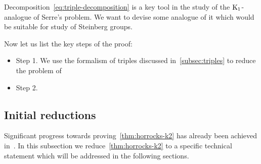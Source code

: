 Decomposition~\eqref{eq:triple-decomposition} is a key tool in the study of the {$\operatorname{K}_1$-analogue of Serre's problem}.
We want to devise some analogue of it which would be suitable for study of Steinberg groups.

Now let us list the key steps of the proof:
\begin{itemize}
    \item Step 1. We use the formalism of triples discussed in~\cref{subsec:triples} to reduce the problem of
    \item Step 2.
\end{itemize}

\subsection{Initial reductions} \label{subsec:structure-theorem-overview}
Significant progress towards proving~\cref{thm:horrocks-k2} has already been achieved in~\cite{LS20}.
In this subsection we reduce~\cref{thm:horrocks-k2} to a specific technical statement which will be addressed in the following sections.

